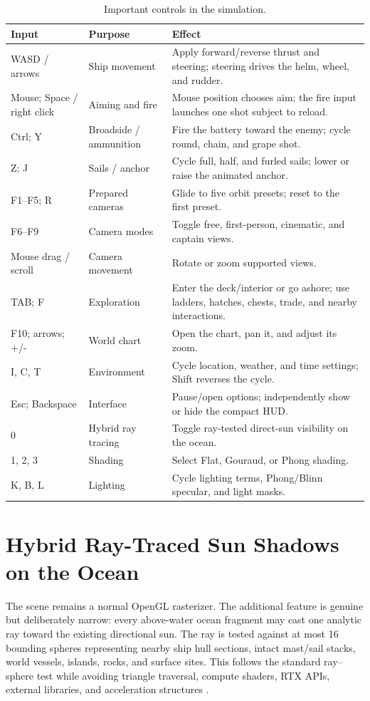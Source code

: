\documentclass[12pt,a4paper]{report}
\begin{document}
\begin{table}[H]
\centering
\caption{Important controls in the simulation.}
\label{tab:controls}
\small
\begin{tabularx}{0.96\textwidth}{p{}p{}Y}
\toprule
\textbf{Input} & \textbf{Purpose} & \textbf{Effect} \\
\midrule
WASD / arrows & Ship movement & Apply forward/reverse thrust and steering; steering drives the helm, wheel, and rudder. \\
Mouse; Space / right click & Aiming and fire & Mouse position chooses aim; the fire input launches one shot subject to reload. \\
Ctrl; Y & Broadside / ammunition & Fire the battery toward the enemy; cycle round, chain, and grape shot. \\
Z; J & Sails / anchor & Cycle full, half, and furled sails; lower or raise the animated anchor. \\
F1--F5; R & Prepared cameras & Glide to five orbit presets; reset to the first preset. \\
F6--F9 & Camera modes & Toggle free, first-person, cinematic, and captain views. \\
Mouse drag / scroll & Camera movement & Rotate or zoom supported views. \\
TAB; F & Exploration & Enter the deck/interior or go ashore; use ladders, hatches, chests, trade, and nearby interactions. \\
F10; arrows; +/- & World chart & Open the chart, pan it, and adjust its zoom. \\
I, C, T & Environment & Cycle location, weather, and time settings; Shift reverses the cycle. \\
Esc; Backspace & Interface & Pause/open options; independently show or hide the compact HUD. \\
0 & Hybrid ray tracing & Toggle ray-tested direct-sun visibility on the ocean. \\
1, 2, 3 & Shading & Select Flat, Gouraud, or Phong shading. \\
K, B, L & Lighting & Cycle lighting terms, Phong/Blinn specular, and light masks. \\
\bottomrule
\end{tabularx}
\end{table}

\clearpage
\section{Hybrid Ray-Traced Sun Shadows on the Ocean}
The scene remains a normal OpenGL rasterizer. The additional feature is genuine but deliberately narrow: every above-water ocean fragment may cast one analytic ray toward the existing directional sun. The ray is tested against at most 16 bounding spheres representing nearby ship hull sections, intact mast/sail stacks, world vessels, islands, rocks, and surface sites. This follows the standard ray--sphere test while avoiding triangle traversal, compute shaders, RTX APIs, external libraries, and acceleration structures \cite{pbrt}.
\end{document}
